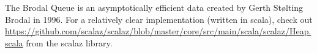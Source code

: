 The Brodal Queue is an asymptotically efficient data created by Gerth Stølting Brodal in 1996\cite{Brodal}.  For a relatively clear implementation (written in scala), check out \url{https://github.com/scalaz/scalaz/blob/master/core/src/main/scala/scalaz/Heap.scala} from the scalaz library.
